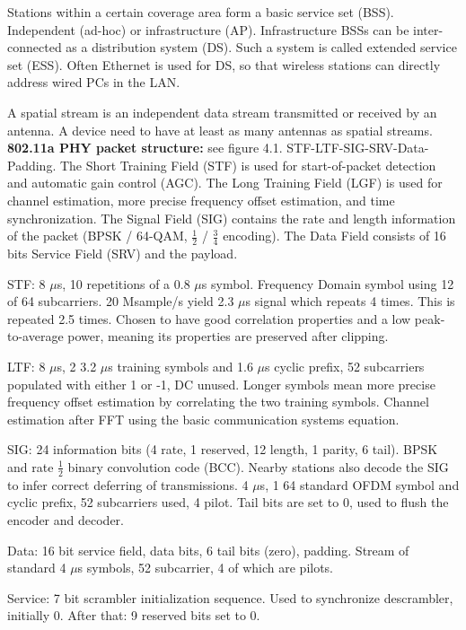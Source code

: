 Stations within a certain coverage area form a basic service set (BSS). Independent (ad-hoc) or infrastructure (AP). Infrastructure BSSs can be inter-connected as a distribution system (DS). Such a system is called extended service set (ESS). Often Ethernet is used for DS, so that wireless stations can directly address wired PCs in the LAN.

A spatial stream is an independent data stream transmitted or received by an antenna. A device need to have at least as many antennas as spatial streams.\\

\textbf{802.11a PHY packet structure:} see \cite{perahia2013} figure 4.1. STF-LTF-SIG-SRV-Data-Padding. The Short Training Field (STF) is used for start-of-packet detection and automatic gain control (AGC). The Long Training Field (LGF) is used for channel estimation, more precise frequency offset estimation, and time synchronization. The Signal Field (SIG) contains the rate and length information of the packet (BPSK / 64-QAM, $\frac{1}{2}$ / $\frac{3}{4}$ encoding). The Data Field consists of 16 bits Service Field (SRV) and the payload.

STF: 8 $\mu$s, 10 repetitions of a 0.8 $\mu$s symbol. Frequency Domain symbol using 12 of 64 subcarriers. 20 Msample/s yield 2.3 $\mu$s signal which repeats 4 times. This is repeated 2.5 times. Chosen to have good correlation properties and a low peak-to-average power, meaning its properties are preserved after clipping.

LTF: 8 $\mu$s, 2 3.2 $\mu$s training symbols and 1.6 $\mu$s cyclic prefix, 52 subcarriers populated with either 1 or -1, DC unused. Longer symbols mean more precise frequency offset estimation by correlating the two training symbols. Channel estimation after FFT using the basic communication systems equation.

SIG: 24 information bits (4 rate, 1 reserved, 12 length, 1 parity, 6 tail). BPSK and rate $\frac{1}{2}$ binary convolution code (BCC). Nearby stations also decode the SIG to infer correct deferring of transmissions. 4 $\mu$s, 1 64 standard OFDM symbol and cyclic prefix, 52 subcarriers used, 4 pilot. Tail bits are set to 0, used to flush the encoder and decoder.

Data: 16 bit service field, data bits, 6 tail bits (zero), padding. Stream of standard 4 $\mu$s symbols, 52 subcarrier, 4 of which are pilots.

Service: 7 bit scrambler initialization sequence. Used to synchronize descrambler, initially 0. After that: 9 reserved bits set to 0.

